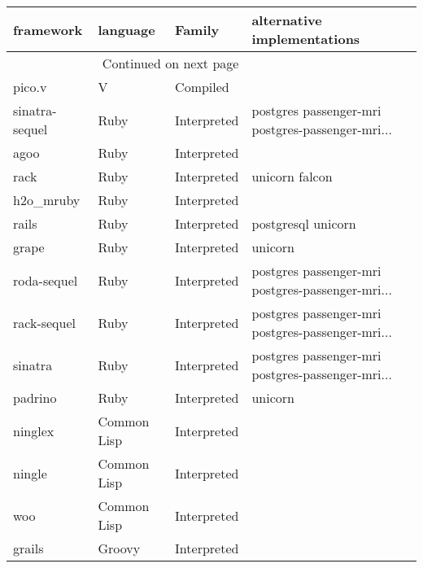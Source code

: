 

\begin{longtable}{llll}
    \toprule
    framework        & language  & Family  & alternative implementations                        \\
    \midrule
    \endhead
    \midrule
    \multicolumn{3}{r}{{Continued on next page}}                                        \\
    \midrule
    \endfoot

    \bottomrule
    \endlastfoot
    pico.v           & V & Compiled          &                                                    \\
    sinatra-sequel   & Ruby & Interpreted        & postgres passenger-mri postgres-passenger-mri...   \\
    agoo             & Ruby & Interpreted        &                                                    \\
    rack             & Ruby & Interpreted        & unicorn falcon                                     \\
    h2o\_mruby       & Ruby & Interpreted        &                                                    \\
    rails            & Ruby & Interpreted        & postgresql unicorn                                 \\
    grape            & Ruby & Interpreted        & unicorn                                            \\
    roda-sequel      & Ruby & Interpreted        & postgres passenger-mri postgres-passenger-mri...   \\
    rack-sequel      & Ruby & Interpreted        & postgres passenger-mri postgres-passenger-mri...   \\
    sinatra          & Ruby & Interpreted        & postgres passenger-mri postgres-passenger-mri...   \\
    padrino          & Ruby & Interpreted        & unicorn                                            \\
    ninglex          & Common Lisp & Interpreted &                                                    \\
    ningle           & Common Lisp & Interpreted &                                                    \\
    woo              & Common Lisp & Interpreted &                                                    \\
    grails           & Groovy & Interpreted      &                                                    \\

\end{longtable}
